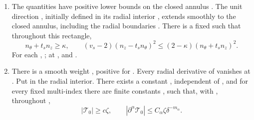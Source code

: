 \begin{theorem}
\begin{enumerate}[label=(\roman*)]
\item The quantities  have positive lower bounds on the closed annulus . The unit direction , initially defined in its radial interior , extends smoothly to the closed annulus, including the radial boundaries . There is a fixed  such that throughout this rectangle,
\begin{equation}
  n_\theta+t_sn_z\geq\kappa,\qquad
  (v_s-2)(n_z-t_sn_\theta)^2\leq(2-\kappa)(n_\theta+t_sn_z)^2.
  \tag{4.26}\label{eq:4.26}
\end{equation}
For each , ; at ,  and .

\item There is a smooth weight , positive for . Every radial derivative of  vanishes at . Put  in the radial interior. There exists a constant , independent of , and for every fixed multi-index  there are finite constants , such that, with , throughout ,
\begin{equation}
  |\mathcal{T}_0|\geq c\zeta,\qquad
  |\partial^\alpha\mathcal{T}_0|\leq C_\alpha\zeta\delta^{-m_\alpha}.
  \tag{4.27}\label{eq:4.27}
\end{equation}


\end{enumerate}
\end{theorem}
